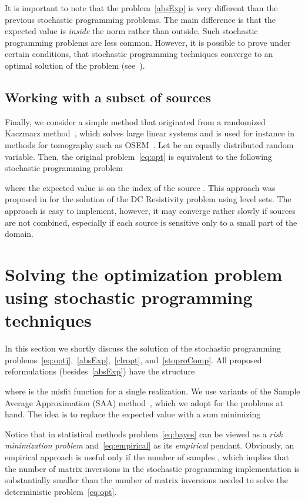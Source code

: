 \documentclass[12pt]{article}
\begin{document}
It is important to note that the problem~\eqref{absExp} is very different than the previous stochastic programming problems. The main difference is that the expected value is {\em inside} the norm rather than outside. Such stochastic programming problems are less common. However, it is possible to prove under certain conditions, that stochastic programming techniques converge to an optimal solution of the problem (see~\cite[Ch.~4]{shapiroBook}).

\subsection{Working with a subset of sources}
\label{meth4}
Finally, we consider a simple method that originated from a randomized Kaczmarz method~\cite{strohmer2009randomized}, which solves large linear systems and is used for instance in methods for  tomography such as OSEM~\cite{HudsonLarkin1994}. Let  be an equally distributed random variable. Then, the original problem~\eqref{eq:opt} is equivalent to the following stochastic programming problem

where the expected value is on the index of the source . This approach was proposed in \cite{KeesAscher2011} for the solution of the DC Resistivity problem using level sets. The approach is easy to implement, however, it may converge rather slowly if sources are not combined, especially if each source is sensitive only to a small part of the domain.

\section{Solving the optimization problem using stochastic programming techniques}
\label{sec3}

In this section we shortly discuss the solution of the stochastic programming problems~\eqref{eq:optj},~\eqref{absExp},~\eqref{clropt}, and~\eqref{stoproComp}. All proposed reformulations (besides~\eqref{absExp}) have the structure

where  is the misfit function for a single realization.
We use variants of the Sample Average Approximation (SAA) method~\cite{LinderothShapiroWright2006}, which we adopt for the problems at hand. The idea is to replace the expected value with a sum minimizing

Notice that in statistical methods problem~\eqref{eq:bayes} can be viewed as a \emph{risk minimization problem} and~\eqref{eq:empirical} as its \emph{empirical} pendant.
Obviously, an empirical approach is useful only if the number of samples , which implies that the number of matrix inversions in the stochastic programming implementation is substantially smaller than the number of matrix inversions needed to solve the deterministic problem~\eqref{eq:opt}.
\end{document}
